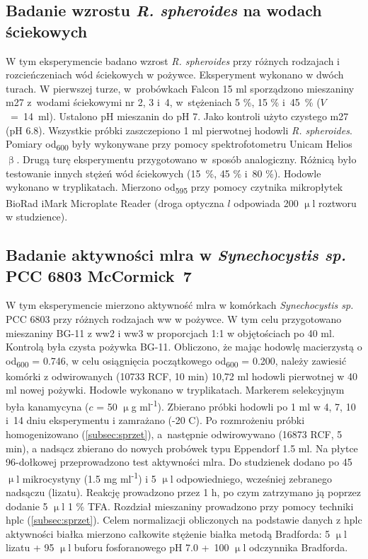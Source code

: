 \subsection{Badanie wzrostu \textit{R. spheroides} na wodach ściekowych}\label{subsec:rhodobacter}
W tym eksperymencie badano wzrost \textit{R. spheroides} przy
różnych rodzajach i rozcieńczeniach wód ściekowych w pożywce.
Eksperyment wykonano w dwóch turach.
W pierwszej turze, w~probówkach Falcon 15 ml sporządzono
mieszaniny \acrshort{m27} z~wodami ściekowymi nr 2, 3 i~4,
w~stężeniach 5 \%, 15 \% i~45~\% ($V$~=~14~ml).
Ustalono pH mieszanin do pH 7.
Jako kontroli użyto czystego \acrshort{m27} (pH 6.8).
Wszystkie próbki zaszczepiono 1 ml pierwotnej hodowli
\textit{R. spheroides}.
Pomiary \acrshort{od}\textsubscript{600} były wykonywane przy pomocy
spektrofotometru Unicam Helios $\upbeta$.
Drugą turę eksperymentu przygotowano w~sposób analogiczny.
Różnicą było testowanie innych stężeń wód ściekowych
(15~\%, 45 \% i~80 \%).
Hodowle wykonano w tryplikatach.
Mierzono \acrshort{od}\textsubscript{595} przy pomocy czytnika
mikropłytek BioRad iMark Microplate Reader
(droga optyczna $l$ odpowiada 200 $\upmu$l roztworu w studzience).

\subsection{Badanie aktywności \acrshort{mlra} w \textit{Synechocystis sp.} PCC 6803 McCormick~7}\label{subsec:mlra}
W tym eksperymencie mierzono aktywność \acrshort{mlra} w komórkach
\textit{Synechocystis sp.} PCC 6803 przy
różnych rodzajach \acrshort{ww} w pożywce.
W tym celu przygotowano mieszaniny BG-11 z \acrshort{ww}2 i \acrshort{ww}3
w proporcjach 1:1 w objętościach po 40 ml.
Kontrolą była czysta pożywka BG-11.
Obliczono, że mając hodowlę macierzystą
o \acrshort{od}\textsubscript{600} = 0.746, w celu osiągnięcia
początkowego \acrshort{od}\textsubscript{600} = 0.200, należy zawiesić
komórki z odwirowanych (10733 RCF, 10 min) 10,72 ml hodowli
pierwotnej w 40 ml nowej pożywki.
Hodowle wykonano w tryplikatach.
Markerem selekcyjnym była kanamycyna ($c$ = 50 $\upmu$g ml\textsuperscript{-1}).
Zbierano próbki hodowli po 1 ml w 4, 7, 10 i~14 dniu eksperymentu
i zamrażano (-20 \degree C).
Po rozmrożeniu próbki homogenizowano (\ref{subsec:sprzet}),
a~następnie odwirowywano (16873 RCF, 5 min), a nadsącz
zbierano do nowych probówek typu Eppendorf 1.5 ml.
Na płytce 96-dołkowej przeprowadzono test aktywności \acrshort{mlra}\@.
Do studzienek dodano po 45 $\upmu$l mikrocystyny (1.5 mg ml\textsuperscript{-1})
i 5 $\upmu$l odpowiedniego, wcześniej zebranego nadsączu (lizatu).
Reakcję prowadzono przez 1 h, po czym zatrzymano ją
poprzez dodanie 5 $\upmu$l 1 \% TFA\@.
Rozdział mieszaniny prowadzono przy pomocy techniki \acrshort{hplc} (\ref{subsec:sprzet}).
Celem normalizacji obliczonych na podstawie danych z \acrshort{hplc} aktywności białka
mierzono całkowite stężenie białka metodą Bradforda:
5 $\upmu$l lizatu + 95 $\upmu$l buforu fosforanowego pH 7.0
+~100 $\upmu$l odczynnika Bradforda.

